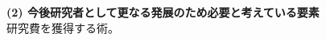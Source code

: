 \documentclass[11pt,a4j,dvipdfmx]{jarticle} 					%
\newcommand{\研究課題名}{象の卵}
\newcommand{\研究機関名}{逢坂大学}
\newcommand{\研究代表者氏名}{湯川秀樹}
\begin{document}
\vspace{5mm}
\noindent
\textbf{(2) 今後研究者として更なる発展のため必要と考えている要素}\\
研究費を獲得する術。



\end{document}
